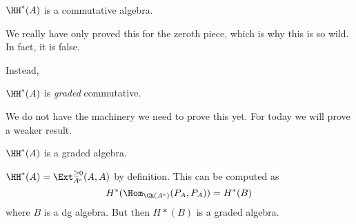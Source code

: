 \documentclass[12pt]{article}
\begin{document}
\begin{conj}
	$\HH^*(A)$ is a commutative algebra.
\end{conj}
\begin{rmk}
	We really have only proved this for the zeroth piece, which is why this is so wild. In fact, it is false.
\end{rmk}
Instead,
\begin{thm}
	$\HH^*(A)$ is \textit{graded} commutative.
\end{thm}
\begin{rmk}
	We do not have the machinery we need to prove this yet. For today we will prove a weaker result.
\end{rmk}
\begin{thm}
	$\HH^*(A)$ is a graded algebra.
\end{thm}
\begin{prf}
	$\HH^*(A)=\Ext_{A^e}^{\ge 0}(A,A)$ by definition. This can be computed as
	\[H^*(\Hom_{\Ch(A^e)}(P_A,P_A))=H^*(B)\]
	where $B$ is a dg algebra. But then $H*(B)$ is a graded algebra.
\end{prf}
\end{document}
